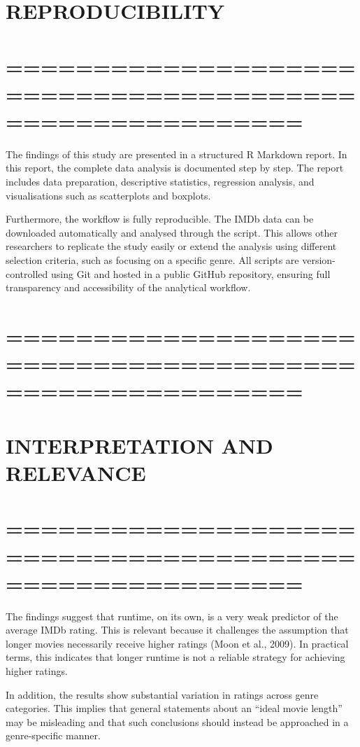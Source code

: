 \documentclass[
]{article}
\begin{document}
\section{REPRODUCIBILITY}\label{reproducibility}

\section{=========================================================}\label{section-11}

The findings of this study are presented in a structured R Markdown
report. In this report, the complete data analysis is documented step by
step. The report includes data preparation, descriptive statistics,
regression analysis, and visualisations such as scatterplots and
boxplots.

Furthermore, the workflow is fully reproducible. The IMDb data can be
downloaded automatically and analysed through the script. This allows
other researchers to replicate the study easily or extend the analysis
using different selection criteria, such as focusing on a specific
genre. All scripts are version-controlled using Git and hosted in a
public GitHub repository, ensuring full transparency and accessibility
of the analytical workflow.

\section{=========================================================}\label{section-12}

\section{INTERPRETATION AND
RELEVANCE}\label{interpretation-and-relevance}

\section{=========================================================}\label{section-13}

The findings suggest that runtime, on its own, is a very weak predictor
of the average IMDb rating. This is relevant because it challenges the
assumption that longer movies necessarily receive higher ratings (Moon
et al., 2009). In practical terms, this indicates that longer runtime is
not a reliable strategy for achieving higher ratings.

In addition, the results show substantial variation in ratings across
genre categories. This implies that general statements about an ``ideal
movie length'' may be misleading and that such conclusions should
instead be approached in a genre-specific manner.
\end{document}
